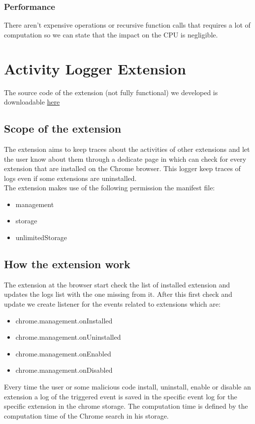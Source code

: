 \documentclass[12pt]{article}
\begin{document}
\begin{multicols}{2}
\subsubsection*{Performance}
There aren't expensive operations or recursive function calls that requires a lot of computation so we can state that the impact on the CPU is negligible.
\section*{Activity Logger Extension}
The source code of the extension (not fully functional) we developed is downloadable \href{https://github.com/andreamultineddu/Activity-Logger}{here}
\subsection*{Scope of the extension}

The extension aims to keep traces about the activities of other extensions and let the user know
about them through a dedicate page in which can check for every extension that are installed on the
Chrome browser. This logger keep traces of logs even if some extensions are uninstalled. \\
The extension makes use of the following permission the manifest file:
\begin{itemize}
	\item  management
	\item  storage
	\item  unlimitedStorage
\end{itemize}
\subsection*{How the extension work}
The extension at the browser start check the list of installed extension and updates the logs list with the one missing from it.
After this first check and update we create listener for the events related to extensions which are: 
\begin{itemize}
	\item  chrome.management.onInstalled
	\item  chrome.management.onUninstalled
	\item  chrome.management.onEnabled
	\item  chrome.management.onDisabled
\end{itemize}
Every time the user or some malicious code install, uninstall, enable or disable an extension a log of the triggered event is saved in the specific event log for the specific extension in the chrome storage.
The computation time is defined by the computation time of the Chrome search in his storage.

\end{multicols}
\end{document}
